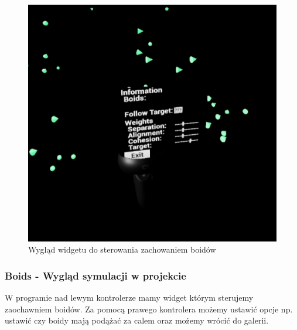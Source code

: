 \documentclass[a4paper,12pt,reqno]{article}
\begin{document}
\begin{figure}[H]%
\centering
\includegraphics[width=0.55\columnwidth]{graphics/boids/BP_BoidHud.png}
\caption{Wygląd widgetu do sterowania zachowaniem boidów
\label{BPExample}}%
%
\qquad
\end{figure}  

\newpage
\subsubsection{Boids - Wygląd symulacji w projekcie}

W programie nad lewym kontrolerze mamy widget którym sterujemy zaochawniem boidów. Za pomocą prawego kontrolera możemy ustawić opcje np. ustawić czy boidy mają podążać za calem oraz możemy wrócić do galerii.

\end{document}
